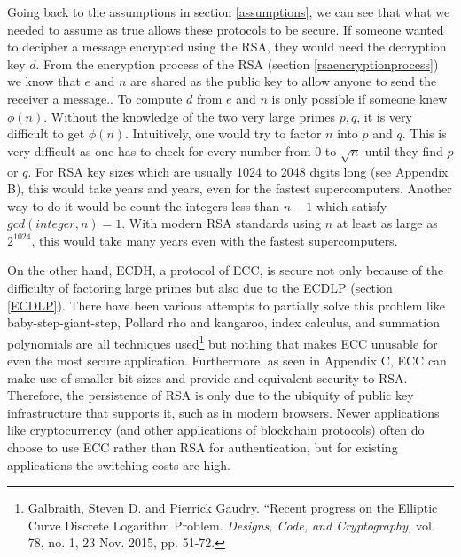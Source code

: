 \documentclass[a4paper,12pt]{article}
\theoremstyle{definition}
\begin{document}
Going back to the assumptions in section \ref{assumptions}, we can see that what we needed to assume as true allows these protocols to be secure. If someone wanted to decipher a message encrypted using the RSA, they would need the decryption key $d$. From the encryption process of the RSA (section \ref{rsaencryptionprocess}) we know that $e$ and $n$ are shared as the public key to allow anyone to send the receiver a message.. To compute $d$ from $e$ and $n$ is only possible if someone knew $\phi(n)$. Without the knowledge of the two very large primes $p,q$, it is very difficult to get $\phi(n)$. Intuitively, one would try to factor $n$ into $p$ and $q$. This is very difficult as one has to check for every number from 0 to $\sqrt{n}$ until they find $p$ or $q$. For RSA key sizes which are usually 1024 to 2048 digits long (see Appendix B), this would take years and years, even for the fastest supercomputers. Another way to do it would be count the integers less than $n-1$ which satisfy $gcd(integer,n)=1$. With modern RSA standards using $n$ at least as large as $2^{1024}$, this would take many years even with the fastest supercomputers.

On the other hand, ECDH, a protocol of ECC, is secure not only because of the difficulty of factoring large primes but also due to the ECDLP (section \ref{ECDLP}). There have been various attempts to partially solve this problem like baby-step-giant-step, Pollard rho and kangaroo, index calculus, and summation polynomials are all techniques used\footnote{Galbraith, Steven D. and Pierrick Gaudry. ``Recent progress on the Elliptic Curve Discrete Logarithm Problem. \textit{Designs, Code, and Cryptography,} vol. 78, no. 1, 23 Nov. 2015, pp. 51-72.} but nothing that makes ECC unusable for even the most secure application. Furthermore, as seen in Appendix C, ECC can make use of smaller bit-sizes and provide and equivalent security to RSA. Therefore, the persistence of RSA is only due to the ubiquity of public key infrastructure that supports it, such as in modern browsers. Newer applications like cryptocurrency (and other 
applications of blockchain protocols) often do choose to use ECC rather 
than RSA for authentication, but for existing applications the switching 
costs are high.
\end{document}
